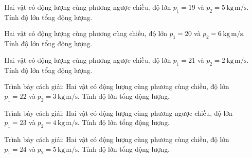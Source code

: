 \begin{ex}
Hai vật có động lượng cùng phương ngược chiều, độ lớn $p_1=19$ và $p_2=5\ \mathrm{kg\,m/s}$. Tính độ lớn tổng động lượng.
\end{ex}

\begin{ex}
Hai vật có động lượng cùng phương cùng chiều, độ lớn $p_1=20$ và $p_2=6\ \mathrm{kg\,m/s}$. Tính độ lớn tổng động lượng.
\end{ex}

\begin{ex}
Hai vật có động lượng cùng phương ngược chiều, độ lớn $p_1=21$ và $p_2=2\ \mathrm{kg\,m/s}$. Tính độ lớn tổng động lượng.
\end{ex}

\begin{bt}
Trình bày cách giải: Hai vật có động lượng cùng phương cùng chiều, độ lớn $p_1=22$ và $p_2=3\ \mathrm{kg\,m/s}$. Tính độ lớn tổng động lượng.
\end{bt}

\begin{bt}
Trình bày cách giải: Hai vật có động lượng cùng phương ngược chiều, độ lớn $p_1=23$ và $p_2=4\ \mathrm{kg\,m/s}$. Tính độ lớn tổng động lượng.
\end{bt}

\begin{bt}
Trình bày cách giải: Hai vật có động lượng cùng phương cùng chiều, độ lớn $p_1=24$ và $p_2=5\ \mathrm{kg\,m/s}$. Tính độ lớn tổng động lượng.
\end{bt}

